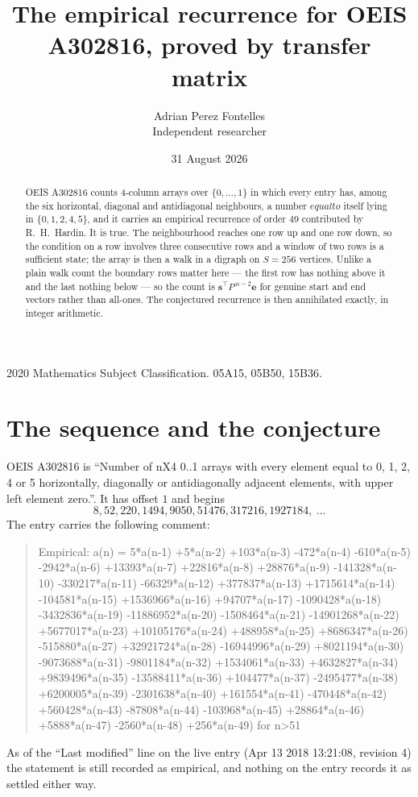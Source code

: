 \documentclass[11pt,a4paper]{article}
\title{The empirical recurrence for OEIS A302816, proved by transfer matrix}
\author{Adrian Perez Fontelles\\ \small Independent researcher}
\date{31 August 2026}
\theoremstyle{plain}
\theoremstyle{definition}
\begin{document}
\maketitle

\begin{abstract}
OEIS A302816 counts $4$-column arrays over $\{0,\dots,1\}$ in which every entry has,
among the six horizontal, diagonal and antidiagonal neighbours, a number $equal to$ itself lying in $\{0,1,2,4,5\}$, and it carries an empirical
recurrence of order $49$ contributed by R.~H.~Hardin. It is true. The neighbourhood
reaches one row up and one row down, so the condition on a row involves three consecutive
rows and a window of two rows is a sufficient state; the array is then a walk in a digraph
on $S=256$ vertices. Unlike a plain walk count the boundary rows matter here --- the first
row has nothing above it and the last nothing below --- so the count is
$\mathbf{s}^{\!\top}P^{\,n-2}\mathbf{e}$ for genuine start and end vectors rather than
all-ones. The conjectured recurrence is then annihilated exactly, in integer arithmetic.
\end{abstract}

\noindent\small 2020 Mathematics Subject Classification. 05A15, 05B50, 15B36.\normalsize

\section{The sequence and the conjecture}

OEIS A302816 is ``Number of nX4 0..1 arrays with every element equal to 0, 1, 2, 4 or 5 horizontally, diagonally or antidiagonally adjacent elements, with upper left element zero.''. It has offset
$1$ and begins
\[
8, 52, 220, 1494, 9050, 51476, 317216, 1927184,\ \dots
\]
The entry carries the following comment:
\begin{quote}\small
Empirical: a(n) = 5*a(n-1) +5*a(n-2) +103*a(n-3) -472*a(n-4) -610*a(n-5) -2942*a(n-6) +13393*a(n-7) +22816*a(n-8) +28876*a(n-9) -141328*a(n-10) -330217*a(n-11) -66329*a(n-12) +377837*a(n-13) +1715614*a(n-14) -104581*a(n-15) +1536966*a(n-16) +94707*a(n-17) -1090428*a(n-18) -3432836*a(n-19) -11886952*a(n-20) -1508464*a(n-21) -14901268*a(n-22) +5677017*a(n-23) +10105176*a(n-24) +488958*a(n-25) +8686347*a(n-26) -515880*a(n-27) +32921724*a(n-28) -16944996*a(n-29) +8021194*a(n-30) -9073688*a(n-31) -9801184*a(n-32) +1534061*a(n-33) +4632827*a(n-34) +9839496*a(n-35) -13588411*a(n-36) +104477*a(n-37) -2495477*a(n-38) +6200005*a(n-39) -2301638*a(n-40) +161554*a(n-41) -470448*a(n-42) +560428*a(n-43) -87808*a(n-44) -103968*a(n-45) +28864*a(n-46) +5888*a(n-47) -2560*a(n-48) +256*a(n-49) for n>51
\end{quote}
As of the ``Last modified'' line on the live entry (Apr 13 2018 13:21:08, revision
4) the statement is still recorded as empirical, and nothing on the entry
records it as settled either way.
\end{document}
